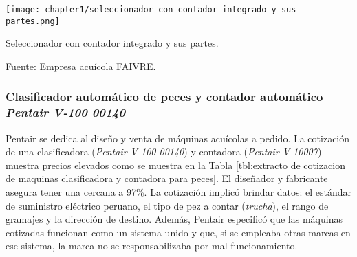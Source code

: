 \begin{myfigure}[H]
	\footnotesize\centering
	\texttt{[image: chapter1/seleccionador con contador integrado y sus partes.png]}
	\caption{Seleccionador con contador integrado y sus partes.}
	\begin{myflushcenter}		
		Fuente: Empresa acuícola FAIVRE.
	\end{myflushcenter}
	\label{fig:seleccionador con contador integrado y sus partes}
\end{myfigure}

\subsubsection{Clasificador automático de peces y contador automático \textit{Pentair V-100 00140}}

Pentair se dedica al diseño y venta de máquinas acuícolas a pedido. La cotización de una clasificadora (\textit{Pentair V-100 00140}) y contadora (\textit{Pentair V-10007}) muestra precios elevados como se muestra en la Tabla \ref{tbl:extracto de cotizacion de maquinas clasificadora y contadora para peces}. El diseñador y fabricante asegura tener una cercana a 97\%. La cotización implicó brindar datos: el estándar de suministro eléctrico peruano, el tipo de pez a contar (\textit{trucha}), el rango de gramajes y la dirección de destino. Además, Pentair especificó que las máquinas cotizadas funcionan como un sistema unido y que, si se empleaba otras marcas en ese sistema, la marca no se responsabilizaba por mal funcionamiento.


